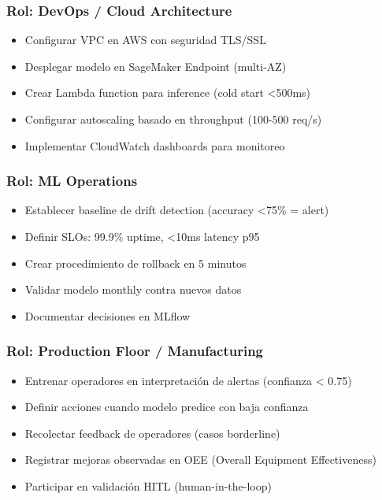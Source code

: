 \documentclass[11pt,letterpaper]{article}
\begin{document}
\subsubsection{Rol: DevOps / Cloud Architecture}

\begin{itemize}
  \item [*] Configurar VPC en AWS con seguridad TLS/SSL
  \item [*] Desplegar modelo en SageMaker Endpoint (multi-AZ)
  \item [*] Crear Lambda function para inference (cold start <500ms)
  \item [*] Configurar autoscaling basado en throughput (100-500 req/s)
  \item [*] Implementar CloudWatch dashboards para monitoreo
\end{itemize}

\subsubsection{Rol: ML Operations}

\begin{itemize}
  \item [*] Establecer baseline de drift detection (accuracy <75\% = alert)
  \item [*] Definir SLOs: 99.9\% uptime, <10ms latency p95
  \item [*] Crear procedimiento de rollback en 5 minutos
  \item [*] Validar modelo monthly contra nuevos datos
  \item [*] Documentar decisiones en MLflow
\end{itemize}

\subsubsection{Rol: Production Floor / Manufacturing}

\begin{itemize}
  \item [*] Entrenar operadores en interpretación de alertas (confianza < 0.75)
  \item [*] Definir acciones cuando modelo predice con baja confianza
  \item [*] Recolectar feedback de operadores (casos borderline)
  \item [*] Registrar mejoras observadas en OEE (Overall Equipment Effectiveness)
  \item [*] Participar en validación HITL (human-in-the-loop)
\end{itemize}
\end{document}
